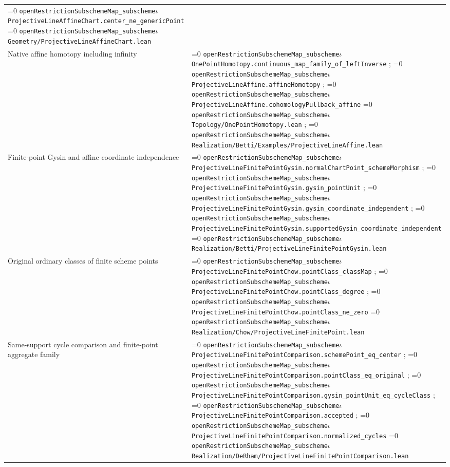 \documentclass[11pt]{article}
\theoremstyle{definition}
\theoremstyle{remark}
\newcommand{\leanpath}[1]{%
  \ifnum\pdfstrcmp{\detokenize{#1}}%
      {\detokenize{openRestrictionSubschemeMap_subschemeι}}=0
    \texttt{\nolinkurl{openRestrictionSubschemeMap_subscheme}}\ensuremath{\iota}%
  \else
    \texttt{\nolinkurl{#1}}%
  \fi}
\begin{document}
\begin{longtable}{@{}>{\raggedright\arraybackslash}p{}
                >{\raggedright\arraybackslash}p{}@{}}
\leanpath{ProjectiveLineAffineChart.center_ne_genericPoint}\newline
\leanpath{Geometry/ProjectiveLineAffineChart.lean}\\
Native affine homotopy including infinity &
\leanpath{OnePointHomotopy.continuous_map_family_of_leftInverse};\newline
\leanpath{ProjectiveLineAffine.affineHomotopy};\newline
\leanpath{ProjectiveLineAffine.cohomologyPullback_affine}\newline
\leanpath{Topology/OnePointHomotopy.lean};\newline
\leanpath{Realization/Betti/Examples/ProjectiveLineAffine.lean}\\
Finite-point Gysin and affine coordinate independence &
{\footnotesize\leanpath{ProjectiveLineFinitePointGysin.normalChartPoint_schemeMorphism}};\newline
\leanpath{ProjectiveLineFinitePointGysin.gysin_pointUnit};\newline
{\footnotesize\leanpath{ProjectiveLineFinitePointGysin.gysin_coordinate_independent}};\newline
{\scriptsize\leanpath{ProjectiveLineFinitePointGysin.supportedGysin_coordinate_independent}}\newline
\leanpath{Realization/Betti/ProjectiveLineFinitePointGysin.lean}\\
Original ordinary classes of finite scheme points &
\leanpath{ProjectiveLineFinitePointChow.pointClass_classMap};\newline
\leanpath{ProjectiveLineFinitePointChow.pointClass_degree};\newline
\leanpath{ProjectiveLineFinitePointChow.pointClass_ne_zero}\newline
\leanpath{Realization/Chow/ProjectiveLineFinitePoint.lean}\\
Same-support cycle comparison and finite-point aggregate family &
\leanpath{ProjectiveLineFinitePointComparison.schemePoint_eq_center};\newline
\leanpath{ProjectiveLineFinitePointComparison.pointClass_eq_original};\newline
{\footnotesize\leanpath{ProjectiveLineFinitePointComparison.gysin_pointUnit_eq_cycleClass}};\newline
\leanpath{ProjectiveLineFinitePointComparison.accepted};\newline
\leanpath{ProjectiveLineFinitePointComparison.normalized_cycles}\newline
\leanpath{Realization/DeRham/ProjectiveLineFinitePointComparison.lean}\\

\end{longtable}
\end{document}
